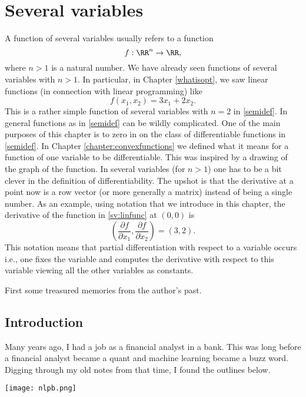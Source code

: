 \documentclass{article}
\newcommand{\pd}[2]{\frac{\partial #1}{\partial #2}}
\begin{document}
\chapter{Several variables}

A function of several variables usually refers to a function
\begin{equation}\label{semidef}
f: \RR^n \rightarrow \RR,
\end{equation}
where $n > 1$ is a natural number. We have already seen functions
of several variables with $n>1$. In particular, in Chapter \ref{whatisopt}, we
saw linear functions (in connection with linear programming) like
\begin{equation}\label{sv:linfunc}
f(x_1, x_2) = 3 x_1 + 2 x_2.
\end{equation}
This is a rather simple function of several variables with $n=2$ in \eqref{semidef}.
In general functions as in \eqref{semidef} can be wildly complicated. One of the main purposes
of this chapter is to zero in on the class of differentiable functions in \eqref{semidef}. In
Chapter \ref{chapter:convexfunctions} we defined what it means for a function of
one variable to be differentiable. This was inspired by a drawing of the graph of the
function. In several variables (for $n > 1$) one has to be a bit clever in the definition
of differentiability. The upshot is that the derivative at a point now is a row vector (or more generally a matrix)
instead of being a single number. As an example, using notation that we introduce in this chapter,
the derivative of the function in \eqref{sv:linfunc} at $(0, 0)$ is
$$
\left(\pd{f}{x_1}, \pd{f}{x_2}\right) = \left(3, 2\right).
$$
This notation means that partial differentiation with respect to a variable occurs i.e., one fixes
the variable and computes the derivative with respect to this variable viewing all the other variables as constants.

First some treasured memories from the author's past.


\section{Introduction}

Many years ago, I had a job as a financial analyst in a bank. This was long before a
financial analyst became a quant and machine learning became a buzz word. Digging through my
old notes from that time, I found the outlines below.

\texttt{[image: nlpb.png]}
\end{document}
